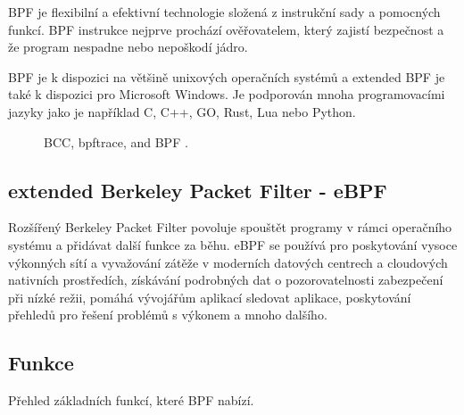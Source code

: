 BPF je flexibilní a efektivní technologie složená z instrukční sady a pomocných funkcí. BPF instrukce nejprve prochází ověřovatelem, který zajistí bezpečnost a že program nespadne nebo nepoškodí jádro.

BPF je k dispozici na většině unixových operačních systémů a extended BPF je také k dispozici pro Microsoft Windows. Je podporován mnoha programovacími jazyky jako je například C, C++, GO, Rust, Lua nebo Python.

\begin{figure}[ht]
  \centering
  \caption{BCC, bpftrace, and BPF \cite{BPFPerformanceTools}.}
  \label{pic:bcc}
\end{figure}

\subsection*{extended Berkeley Packet Filter - eBPF}
Rozšířený Berkeley Packet Filter\cite{EBpf} povoluje spouštět programy v rámci operačního systému a přidávat další funkce za běhu.
eBPF se používá pro  poskytování vysoce výkonných sítí a vyvažování zátěže v moderních datových centrech a cloudových nativních prostředích,
získávání podrobných dat o pozorovatelnosti zabezpečení při nízké režii, pomáhá vývojářům aplikací sledovat aplikace,
poskytování přehledů pro řešení problémů s výkonem a mnoho dalšího.

\subsection*{Funkce}

Přehled základních funkcí, které BPF nabízí.


